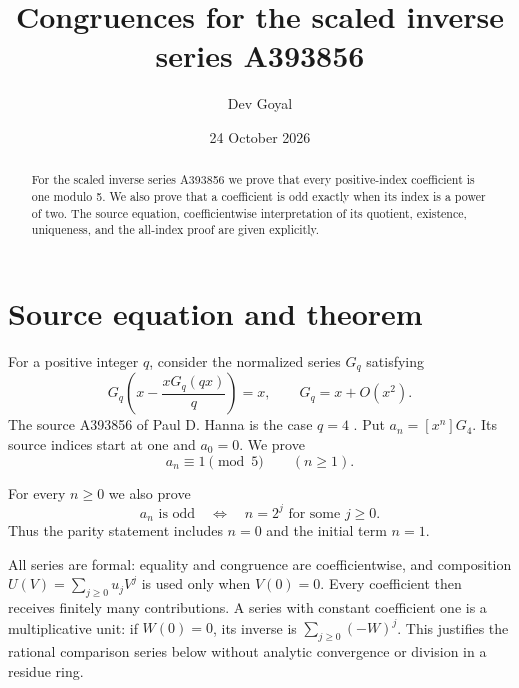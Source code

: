 \documentclass[11pt,a4paper]{article}
\title{Congruences for the scaled inverse series A393856}
\author{Dev Goyal}
\date{24 October 2026}
\theoremstyle{remark}\newtheorem{remark}[theorem]{Remark}
\begin{document}
\maketitle
\begin{center}\end{center}

\begin{abstract}
For the scaled inverse series A393856 we prove that every
positive-index coefficient is one modulo 5.
We also prove that a coefficient is odd exactly when its index is a power of two.
The source equation, coefficientwise interpretation of its quotient,
existence, uniqueness, and the all-index proof are given explicitly.
\end{abstract}
\section{Source equation and theorem}
For a positive integer $q$, consider the normalized series $G_q$ satisfying
\begin{equation}\label{eq:scaled-source}
 G_q\left(x-\frac{xG_q(qx)}q\right)=x,
 \qquad G_q=x+O(x^2).
\end{equation}
The source A393856 of Paul D. Hanna is the case $q=4$
\cite{oeis}. Put $a_n=[x^n]G_{4}$. Its source indices
start at one and $a_0=0$. We prove
\[
 a_n\equiv1\pmod{5}\qquad(n\ge1).
\]

For every $n\ge0$ we also prove
\[
 a_n\text{ is odd}\quad\Longleftrightarrow\quad
 n=2^j\text{ for some }j\ge0.
\]
Thus the parity statement includes $n=0$ and the initial term $n=1$.

All series are formal: equality and congruence are coefficientwise, and
composition $U(V)=\sum_{j\ge0}u_jV^j$ is used only when $V(0)=0$.
Every coefficient then receives finitely many contributions.
A series with constant coefficient one is a multiplicative unit:
if $W(0)=0$, its inverse is $\sum_{j\ge0}(-W)^j$.
This justifies the rational comparison series below without analytic
convergence or division in a residue ring.
\end{document}
